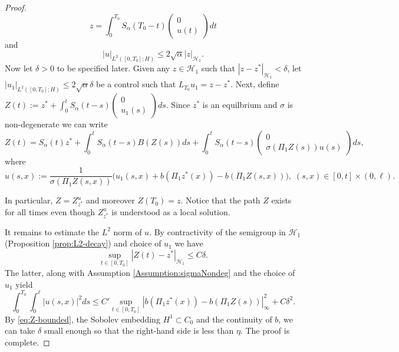 \documentclass[10pt, reqno]{amsart}
\newcommand{\h}{\mathcal{H}}
\theoremstyle{definition}
\numberwithin{lem}{section}
\numberwithin{cor}{section}
\numberwithin{prop}{section}
\numberwithin{thm}{section}
\numberwithin{dfn}{section}
\begin{document}
\begin{proof}
\begin{equation*}
        z = \int_0^{T_0} S_\alpha(T_0-t)\begin{pmatrix} 0 \\u(t) \end{pmatrix}dt
    \end{equation*}
    and
    \begin{equation*} \label{eq:lin-opt-contrl-2}
        |u|_{L^2([0,T_0];H)} \leq 2 \sqrt{\alpha} |z|_{\h_1}.
    \end{equation*}
   Now let $\delta>0$  to be specified later. Given any $z \in\h_1$ such that
    $|z-z^*|_{\h_1} < \delta$, let $|u_1|_{L^2([0,T_0];H)} \leq 2 \sqrt{\alpha} \delta$ be a control such that
    $L_{T_0} u_1 = z-z^*$. Next, 
    define $Z(t) := z^* + \int_0^t S_\alpha(t-s) \begin{pmatrix} 0 \\u_1(s) \end{pmatrix}ds.$ Since $z^*$ is an equilbrium and $\sigma$ is non-degenerate we can write
    \begin{equation*}
        Z(t) = S_\alpha(t)z^* + \int_0^t S_\alpha(t-s) B(Z(s))ds  + \int_0^t S_\alpha(t-s) \begin{pmatrix} 0 \\\sigma(\Pi_1 Z(s))u(s) \end{pmatrix}ds,
    \end{equation*}
    where 
    \begin{equation*}
        u(s,x) := \frac{1}{\sigma(\Pi_1 Z(s,x))} \bigg(u_1(s,x) + b(\Pi_1 z^*(x)) - b( \Pi_1 Z(s,x)) \bigg),\; (s,x)\in[0,t]\times(0,\ell).
    \end{equation*}
   
    In particular, $Z=Z_{z^*}^{u}$ and moreover $Z(T_0)=z.$ Notice that the path $Z$ exists for all times even though $Z_{z^*}^{u}$ is understood as a local solution. 



    
    It remains to estimate the $L^2$ norm of $u.$ By contractivity of the semigroup in $\h_1$ (Proposition \ref{prop:L2-decay}) and choice of $u_1$ we have
    \begin{equation} \label{eq:Z-bounded}
        \sup_{t \in [0,T_0]} |Z(t) - z^*|_{\h_1 } \leq C  \delta.
    \end{equation}
    The latter, along with Assumption \ref{Assumption:sigmaNondeg} and the choice of $u_1$ yield  
    \begin{equation*}
        \int_0^{T_0} \int_0^\ell |u(s,x)|^2 ds
        \leq C' \sup_{t \in [0,T_0]} |b( \Pi_1 z^*(x)) - b(\Pi_1 Z(s))|^2_{\infty} + C \delta^2.
    \end{equation*}
    By \eqref{eq:Z-bounded}, the Sobolev embedding $ H^1\subset C_0$ and the continuity of $b$, we can take $\delta$ small enough so that the right-hand side is less than $\eta.$ The proof is complete. 
\end{proof}
\end{document}
